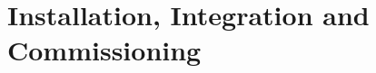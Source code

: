 \section{Installation, Integration and Commissioning}
\label{sec:fdsp-slow-cryo-install}    %
\label{sec:fddp-slow-cryo-install} %
\label{sec:fdgen-slow-cryo-install} %










